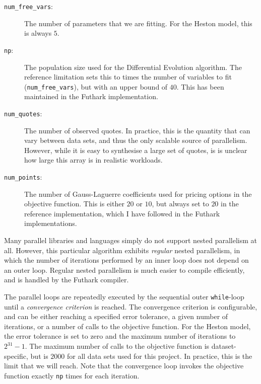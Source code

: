 \documentclass{article}
\begin{document}
\begin{description}
\item[\texttt{num\_free\_vars}:] The number of parameters that we are
  fitting.  For the Heston model, this is always $5$.
\item[\texttt{np}:] The population size used for the Differential
  Evolution algorithm.  The reference limitation sets this to times
  the number of variables to fit (\texttt{num\_free\_vars}), but with
  an upper bound of $40$.  This has been maintained in the Futhark
  implementation.
\item[\texttt{num\_quotes}:] The number of observed quotes.  In
  practice, this is the quantity that can vary between data sets, and
  thus the only scalable source of parallelism.  However, while it is
  easy to synthesise a large set of quotes, is is unclear how large
  this array is in realistic workloads.
\item[\texttt{num\_points}:] The number of Gauss-Laguerre coefficients
  used for pricing options in the objective function.  This is either
  $20$ or $10$, but always set to $20$ in the reference
  implementation, which I have followed in the Futhark
  implementations.
\end{description}

Many parallel libraries and languages simply do not support nested
parallelism at all.  However, this particular algorithm exhibits
\textit{regular} nested parallelism, in which the number of iterations
performed by an inner loop does not depend on an outer loop.  Regular
nested parallelism is much easier to compile efficiently, and is
handled by the Futhark compiler.

The parallel loops are repeatedly executed by the sequential outer
\texttt{while}-loop until a \textit{convergence criterion} is reached.
The convergence criterion is configurable, and can be either reaching
a specified error tolerance, a given number of iterations, or a number
of calls to the objective function.  For the Heston model, the error
tolerance is set to zero and the maximum number of iterations to
$2^{31}-1$.  The maximum number of calls to the objective function is
dataset-specific, but is $2000$ for all data sets used for this
project.  In practice, this is the limit that we will reach.  Note
that the convergence loop invokes the objective function exactly
\texttt{np} times for each iteration.
\end{document}
